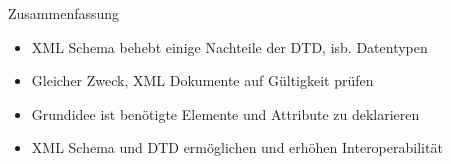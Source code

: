 \documentclass{beamer}
\begin{document}
\begin{frame}{Zusammenfassung}
	
	\begin{itemize}
		\item XML Schema behebt einige Nachteile der DTD, isb. Datentypen
		\item Gleicher Zweck, XML Dokumente auf Gültigkeit prüfen
		\item Grundidee ist benötigte Elemente und Attribute zu deklarieren
		\item XML Schema und DTD ermöglichen und erhöhen Interoperabilität
	\end{itemize}
	
\end{frame}
\end{document}
